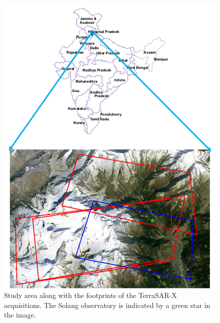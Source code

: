 \begin{figure}[!htbp]
	\centering
	\includegraphics[width=\columnwidth]{Figures/study_area_sw_dual}
	\caption [Study area of Solang, Himachal Pradesh, India]{Study area along with the footprints of the TerraSAR-X acquisitions. The Solang observatory is indicated by a green star in the image.}
	\label{fig:study_area_dual_pol}	
\end{figure}

